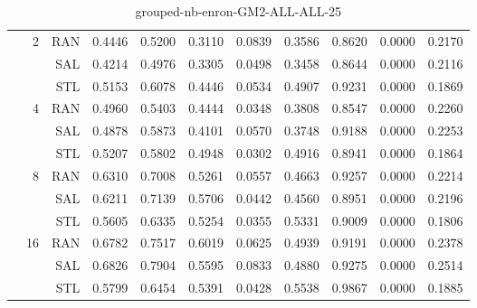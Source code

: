 \begin{center}
\begin{table}[htbp]
\begin{center}
\begin{tabular}{ | r | r | r | r | r | r | r | r | r | r | r |}
 & \multirow{3}{*}{2} & RAN & 0.4446 & 0.5200 & 0.3110 & 0.0839 & 0.3586 & 0.8620 & 0.0000 & 0.2170\\ \cline{3-11}
 &   & SAL & 0.4214 & 0.4976 & 0.3305 & 0.0498 & 0.3458 & 0.8644 & 0.0000 & 0.2116\\ \cline{3-11}
 &   & STL & 0.5153 & 0.6078 & 0.4446 & 0.0534 & 0.4907 & 0.9231 & 0.0000 & 0.1869\\ \cline{2-11}
 & \multirow{3}{*}{4} & RAN & 0.4960 & 0.5403 & 0.4444 & 0.0348 & 0.3808 & 0.8547 & 0.0000 & 0.2260\\ \cline{3-11}
 &   & SAL & 0.4878 & 0.5873 & 0.4101 & 0.0570 & 0.3748 & 0.9188 & 0.0000 & 0.2253\\ \cline{3-11}
 &   & STL & 0.5207 & 0.5802 & 0.4948 & 0.0302 & 0.4916 & 0.8941 & 0.0000 & 0.1864\\ \cline{2-11}
 & \multirow{3}{*}{8} & RAN & 0.6310 & 0.7008 & 0.5261 & 0.0557 & 0.4663 & 0.9257 & 0.0000 & 0.2214\\ \cline{3-11}
 &   & SAL & 0.6211 & 0.7139 & 0.5706 & 0.0442 & 0.4560 & 0.8951 & 0.0000 & 0.2196\\ \cline{3-11}
 &   & STL & 0.5605 & 0.6335 & 0.5254 & 0.0355 & 0.5331 & 0.9009 & 0.0000 & 0.1806\\ \cline{2-11}
 & \multirow{3}{*}{16} & RAN & 0.6782 & 0.7517 & 0.6019 & 0.0625 & 0.4939 & 0.9191 & 0.0000 & 0.2378\\ \cline{3-11}
 &   & SAL & 0.6826 & 0.7904 & 0.5595 & 0.0833 & 0.4880 & 0.9275 & 0.0000 & 0.2514\\ \cline{3-11}
 &   & STL & 0.5799 & 0.6454 & 0.5391 & 0.0428 & 0.5538 & 0.9867 & 0.0000 & 0.1885\\ \cline{2-11}
\hline
\end{tabular}
\caption{grouped-nb-enron-GM2-ALL-ALL-25}
\end{center}
 \end{table}
\end{center}

